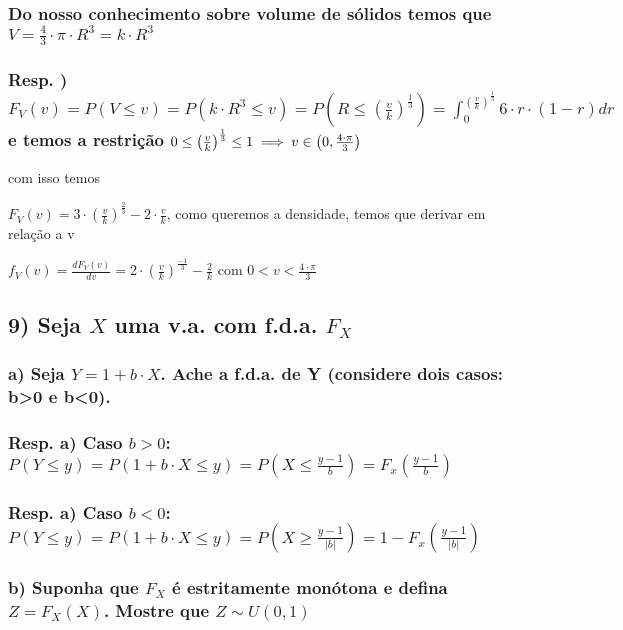 \documentclass[portuguese]{article}
\begin{document}
\subsubsection*{\textmd{Do nosso conhecimento sobre volume de sólidos temos que $V=\frac{4}{3}\cdot\pi\cdot R^{3}=k\cdot R^{3}$}}


\subsubsection*{\textmd{Resp. ) $F_{V}(v)=P(V\leq v)=P(k\cdot R^{3}\leq v)=P(R\leq\left(\frac{v}{k}\right)^{\frac{1}{3}})=\int_{0}^{\left(\frac{v}{k}\right)^{\frac{1}{3}}}6\cdot r\cdot(1-r)dr$
e temos a restrição $0\leq\left(\frac{v}{k}\right)^{\frac{1}{3}}\leq1\protect\implies v\in\left(0,\frac{4\cdot\pi}{3}\right)$}}

com isso temos

$F_{V}(v)=3\cdot\left(\frac{v}{k}\right)^{\frac{2}{3}}-2\cdot\frac{v}{k}$,
como queremos a densidade, temos que derivar em relação a v 

$f_{V}(v)=\frac{dF_{V}(v)}{dv}=2\cdot\left(\frac{v}{k}\right)^{\frac{-1}{3}}-\frac{2}{k}$
com $0<v<\frac{4\cdot\pi}{3}$

\textbf{\textcompwordmark{}}


\subsection*{\textmd{9) Seja $X$ uma v.a. com f.d.a. $F_{X}$}}


\subsubsection*{\textmd{a) Seja $Y=1+b\cdot X$. Ache a f.d.a. de Y (considere dois
casos: b>0 e b<0).}}


\subsubsection*{\textmd{Resp. a) Caso $b>0$: $P(Y\leq y)=P(1+b\cdot X\leq y)=P(X\leq\frac{y-1}{b})=F_{x}(\frac{y-1}{b})$}}


\subsubsection*{\textmd{Resp. a) Caso $b<0$: $P(Y\leq y)=P(1+b\cdot X\leq y)=P(X\geq\frac{y-1}{|b|})=1-F_{x}(\frac{y-1}{|b|})$}}


\subsubsection*{\textmd{b) Suponha que $F_{X}$ é estritamente monótona e defina
$Z=F_{X}(X)$. Mostre que $Z\sim U(0,1)$}}
\end{document}
